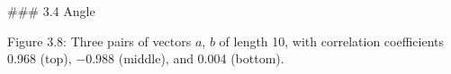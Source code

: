 

### 3.4 Angle

Figure 3.8: Three pairs of vectors \(a\), \(b\) of length 10, with correlation coefficients 0.968 (top), \(-0.988\) (middle), and 0.004 (bottom).

